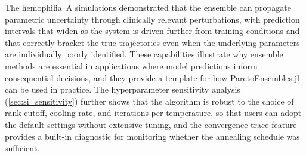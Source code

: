 \documentclass[preprint,review,12pt]{elsarticle}
\begin{document}
The hemophilia~A simulations demonstrated that the ensemble can propagate parametric uncertainty through clinically relevant perturbations, with prediction intervals that widen as the system is driven further from training conditions and that correctly bracket the true trajectories even when the underlying parameters are individually poorly identified.
These capabilities illustrate why ensemble methods are essential in applications where model predictions inform consequential decisions, and they provide a template for how ParetoEnsembles.jl can be used in practice.
The hyperparameter sensitivity analysis (\cref{sec:si_sensitivity}) further shows that the algorithm is robust to the choice of rank cutoff, cooling rate, and iterations per temperature, so that users can adopt the default settings without extensive tuning, and the convergence trace feature provides a built-in diagnostic for monitoring whether the annealing schedule was sufficient.
\end{document}
